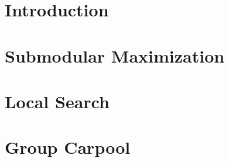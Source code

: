 \begin{abstract}

\end{abstract}

\section{Introduction}


\section{Submodular Maximization}
\label{sec:sub}


\section{Local Search}
\label{sec:local}


\section{Group Carpool}
\label{sec:group}

